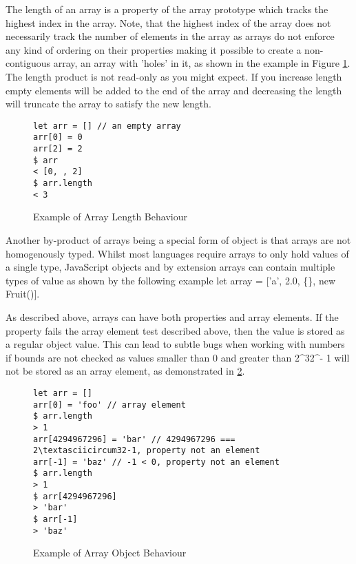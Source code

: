 \documentclass[]{final_report}
\begin{document}
The length of an array is a property of the array prototype which tracks the highest index in the array. Note, that the highest index of the array does not necessarily track the number of elements in the array as arrays do not enforce any kind of ordering on their properties making it possible to create a non-contiguous array, an array with 'holes' in it, as shown in the example in Figure \ref{fig:js-array-length}. The length product is not read-only as you might expect. If you increase length empty elements will be added to the end of the array and decreasing the length will truncate the array to satisfy the new length.

\begin{figure}[h]
\begin{verbatim}
let arr = [] // an empty array
arr[0] = 0
arr[2] = 2
$ arr
< [0, , 2]
$ arr.length 
< 3
\end{verbatim}
\caption{\label{fig:js-array-length} Example of Array Length Behaviour}
\end{figure}

Another by-product of arrays being a special form of object is that arrays are not homogenously typed. Whilst most languages require arrays to only hold values of a single type, JavaScript objects and by extension arrays can contain multiple types of value as shown by the following example let array = ['a', 2.0, \{\}, new Fruit()]. 

As described above, arrays can have both properties and array elements. If the property fails the array element test described above, then the value is stored as a regular object value. This can lead to subtle bugs when working with numbers if bounds are not checked as values smaller than 0 and greater than 2\textasciicircum32\textasciicircum - 1 will not be stored as an array element, as demonstrated in \ref{fig:js-array-max-length}.

\begin{figure}[h]
\begin{verbatim}
let arr = []
arr[0] = 'foo' // array element
$ arr.length
> 1
arr[4294967296] = 'bar' // 4294967296 === 2\textasciicircum32-1, property not an element
arr[-1] = 'baz' // -1 < 0, property not an element
$ arr.length
> 1
$ arr[4294967296]
> 'bar'
$ arr[-1]
> 'baz'
\end{verbatim}
\caption{\label{fig:js-array-max-length} Example of Array Object Behaviour }
\end{figure}
\end{document}
